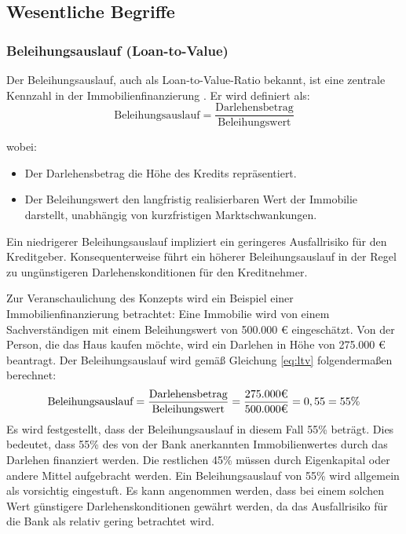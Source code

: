 
\subsection{Wesentliche Begriffe}
\subsubsection{Beleihungsauslauf (Loan-to-Value)}
Der Beleihungsauslauf, auch als Loan-to-Value-Ratio bekannt, ist eine zentrale Kennzahl in der Immobilienfinanzierung \parencite{BelWertV_3}. Er wird definiert als:
\begin{equation}
    \text{Beleihungsauslauf} = \frac{\text{Darlehensbetrag}}{\text{Beleihungswert}}
    \label{eq:ltv}
\end{equation}

\noindent wobei:
\begin{itemize}
    \item Der Darlehensbetrag die Höhe des Kredits repräsentiert.
    \item Der Beleihungswert den langfristig realisierbaren Wert der Immobilie darstellt, unabhängig von kurzfristigen Marktschwankungen.
\end{itemize}

Ein niedrigerer Beleihungsauslauf impliziert ein geringeres Ausfallrisiko für den Kreditgeber. Konsequenterweise führt ein höherer Beleihungsauslauf in der Regel zu ungünstigeren Darlehenskonditionen für den Kreditnehmer.

Zur Veranschaulichung des Konzepts wird ein Beispiel einer Immobilienfinanzierung betrachtet:
Eine Immobilie wird von einem Sachverständigen mit einem Beleihungswert von 500.000 € eingeschätzt. Von der Person, die das Haus kaufen möchte, wird ein Darlehen in Höhe von 275.000 € beantragt.
Der Beleihungsauslauf wird gemäß Gleichung \ref{eq:ltv} folgendermaßen berechnet:
\begin{equation}
    \text{Beleihungsauslauf} = \frac{\text{Darlehensbetrag}}{\text{Beleihungswert}} = \frac{275.000 \mbox{\texteuro}}{500.000 \mbox{\texteuro}} = 0,55 = 55\%
\end{equation}
Es wird festgestellt, dass der Beleihungsauslauf in diesem Fall 55\% beträgt. Dies bedeutet, dass 55\% des von der Bank anerkannten Immobilienwertes durch das Darlehen finanziert werden. Die restlichen 45\% müssen durch Eigenkapital oder andere Mittel aufgebracht werden.
Ein Beleihungsauslauf von 55\% wird allgemein als vorsichtig eingestuft. Es kann angenommen werden, dass bei einem solchen Wert günstigere Darlehenskonditionen gewährt werden, da das Ausfallrisiko für die Bank als relativ gering betrachtet wird.
